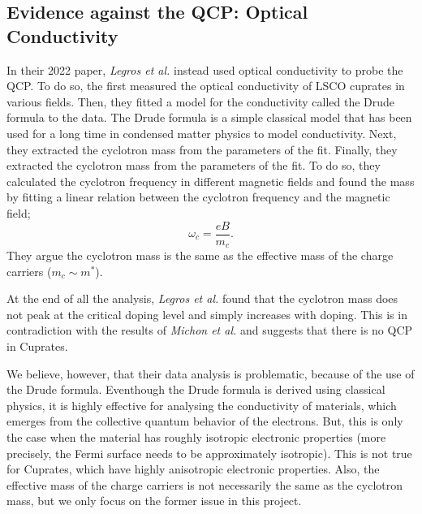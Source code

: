 \subsection{Evidence against the QCP: Optical Conductivity}
In their 2022 paper, \textit{Legros et al.} \cite{legros2022} instead used optical conductivity to
probe the QCP. To do so, the first measured the optical conductivity of LSCO cuprates in various
fields. Then, they fitted a model for the conductivity called the Drude formula to the data. The
Drude formula is a simple classical model that has been used for a long time in condensed matter
physics to model conductivity. Next, they extracted the cyclotron mass from the parameters of the
fit. Finally, they extracted the cyclotron mass from the parameters of the fit. To do so, they
calculated the cyclotron frequency in different magnetic fields and found the mass by fitting a
linear relation between the cyclotron frequency and the magnetic field;
\begin{equation}
    \omega_c = \frac{eB}{m_c}.
\end{equation}
They argue the cyclotron mass is the same as the effective mass of the charge carriers
($m_c \sim m^*$).

At the end of all the analysis, \textit{Legros et al.} found that the cyclotron mass does not peak
at the critical doping level and simply increases with doping. This is in contradiction with the
results of \textit{Michon et al.} and suggests that there is no QCP in Cuprates.

We believe, however, that their data analysis is problematic, because of the use of the Drude
formula. Eventhough the Drude formula is derived using classical physics, it is highly effective for
analysing the conductivity of materials, which emerges from the collective quantum behavior of the
electrons. But, this is only the case when the material has roughly isotropic electronic properties
(more precisely, the Fermi surface needs to be approximately isotropic). This is not true for
Cuprates, which have highly anisotropic electronic properties. Also, the effective mass of the
charge carriers is not necessarily the same as the cyclotron mass, but we only focus on the former
issue in this project.
